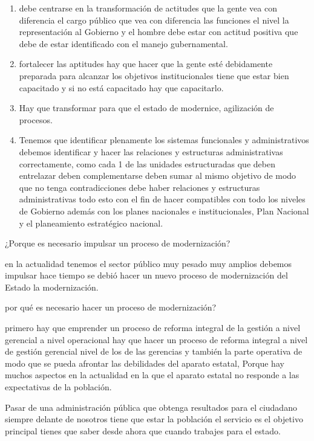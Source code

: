 \documentclass[
  a4paper,
]{article}
\providecommand{\tightlist}{%
  \setlength{\itemsep}{0pt}\setlength{\parskip}{0pt}}\usepackage{longtable,booktabs,array}
\begin{document}
\begin{enumerate}
\def\labelenumi{\arabic{enumi}.}
\tightlist
\item
  debe centrarse en la transformación de actitudes que la gente vea con
  diferencia el cargo público que vea con diferencia las funciones el
  nivel la representación al Gobierno y el hombre debe estar con actitud
  positiva que debe de estar identificado con el manejo gubernamental.
\item
  fortalecer las aptitudes hay que hacer que la gente esté debidamente
  preparada para alcanzar los objetivos institucionales tiene que estar
  bien capacitado y si no está capacitado hay que capacitarlo.
\item
  Hay que transformar para que el estado de modernice, agilización de
  procesos.
\item
  Tenemos que identificar plenamente los sistemas funcionales y
  administrativos debemos identificar y hacer las relaciones y
  estructuras administrativas correctamente, como cada 1 de las unidades
  estructuradas que deben entrelazar deben complementarse deben sumar al
  mismo objetivo de modo que no tenga contradicciones debe haber
  relaciones y estructuras administrativas todo esto con el fin de hacer
  compatibles con todo los niveles de Gobierno además con los planes
  nacionales e institucionales, Plan Nacional y el planeamiento
  estratégico nacional.
\end{enumerate}

¿Porque es necesario impulsar un proceso de modernización?

en la actualidad tenemos el sector público muy pesado muy amplios
debemos impulsar hace tiempo se debió hacer un nuevo proceso de
modernización del Estado la modernización.

por qué es necesario hacer un proceso de modernización?

primero hay que emprender un proceso de reforma integral de la gestión a
nivel gerencial a nivel operacional hay que hacer un proceso de reforma
integral a nivel de gestión gerencial nivel de los de las gerencias y
también la parte operativa de modo que se pueda afrontar las debilidades
del aparato estatal, Porque hay muchos aspectos en la actualidad en la
que el aparato estatal no responde a las expectativas de la población.

Pasar de una administración pública que obtenga resultados para el
ciudadano siempre delante de nosotros tiene que estar la población el
servicio es el objetivo principal tienes que saber desde ahora que
cuando trabajes para el estado.
\end{document}
